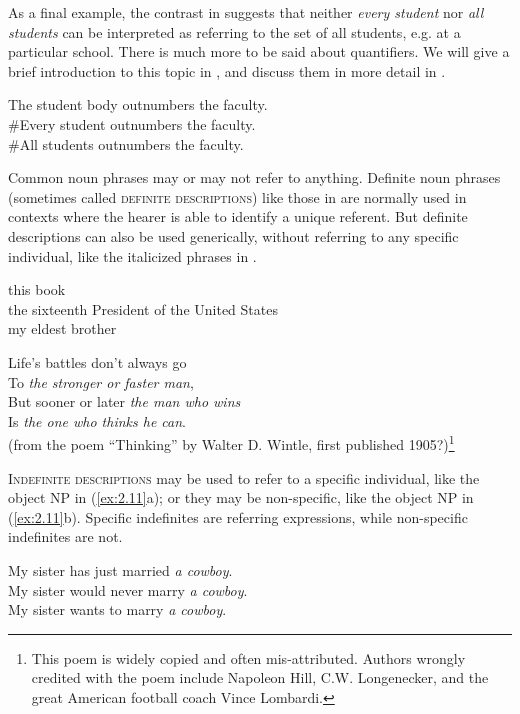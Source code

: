 As a final example, the contrast in  suggests that neither \textit{every student} nor \textit{all students} can be interpreted as referring to the set of all students, e.g. at a particular school. There is much more to be said about quantifiers. We will give a brief introduction to this topic in , and discuss them in more detail in .


\ea \label{ex:2.8}
\ea The student body outnumbers the faculty.\\                
\ex \#Every student outnumbers the faculty.\\
\ex \#All students outnumbers the faculty.
\z
\z


Common noun phrases may or may not refer to anything. Definite noun phrases (sometimes called \textsc{definite descriptions}) like those in  are normally used in contexts where the hearer is able to identify a unique referent. But definite descriptions can also be used generically, without referring to any specific individual, like the italicized phrases in .


\ea \label{ex:2.9}
\ea this book\\
\ex the sixteenth President of the United States\\
\ex my eldest brother
                       \z
\z

\ea \label{ex:2.10}
Life’s battles don’t always go\\
   To \textit{the stronger or faster man},\\
But sooner or later \textit{the man who wins}\\
   Is \textit{the one who thinks he can}.\\
(from the poem “Thinking” by Walter D. Wintle, first published 1905?)\footnote{This poem is widely copied and often mis-attributed. Authors wrongly credited with the poem include Napoleon Hill, C.W. Longenecker, and the great American football coach Vince Lombardi.}
\z


\textsc{Indefinite descriptions} may be used to refer to a specific individual, like the object NP in (\ref{ex:2.11}a); or they may be non-specific, like the object NP in (\ref{ex:2.11}b). Specific indefinites are referring expressions, while non-specific indefinites are not.


\ea \label{ex:2.11}
\ea My sister has just married \textit{a cowboy}.\\
\ex My sister would never marry \textit{a cowboy}.\\
\ex My sister wants to marry \textit{a cowboy}.
                       \z
\z


